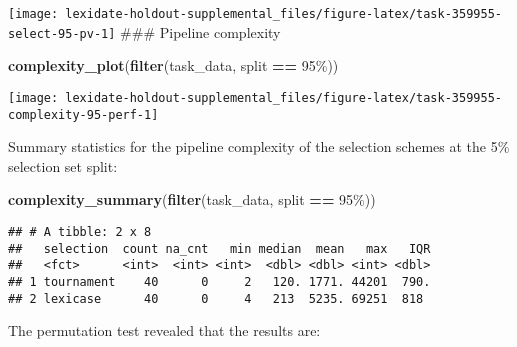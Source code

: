 \documentclass[
]{book}
\newenvironment{Shaded}{\begin{snugshade}}{\end{snugshade}}
\newcommand{\AttributeTok}[1]{\textcolor[rgb]{0.13,0.29,0.53}{#1}}
\newcommand{\DecValTok}[1]{\textcolor[rgb]{0.00,0.00,0.81}{#1}}
\newcommand{\FunctionTok}[1]{\textcolor[rgb]{0.13,0.29,0.53}{\textbf{#1}}}
\newcommand{\NormalTok}[1]{#1}
\newcommand{\OtherTok}[1]{\textcolor[rgb]{0.56,0.35,0.01}{#1}}
\newcommand{\SpecialCharTok}[1]{\textcolor[rgb]{0.81,0.36,0.00}{\textbf{#1}}}
\newcommand{\StringTok}[1]{\textcolor[rgb]{0.31,0.60,0.02}{#1}}
\begin{document}
\texttt{[image: lexidate-holdout-supplemental\_files/figure-latex/task-359955-select-95-pv-1]}
\#\#\# Pipeline complexity

\begin{Shaded}
\begin{Highlighting}[]
\FunctionTok{complexity\_plot}\NormalTok{(}\FunctionTok{filter}\NormalTok{(task\_data, split }\SpecialCharTok{==} \StringTok{\textquotesingle{}95\%\textquotesingle{}}\NormalTok{))}
\end{Highlighting}
\end{Shaded}

\texttt{[image: lexidate-holdout-supplemental\_files/figure-latex/task-359955-complexity-95-perf-1]}

Summary statistics for the pipeline complexity of the selection schemes at the 5\% selection set split:

\begin{Shaded}
\begin{Highlighting}[]
\FunctionTok{complexity\_summary}\NormalTok{(}\FunctionTok{filter}\NormalTok{(task\_data, split }\SpecialCharTok{==} \StringTok{\textquotesingle{}95\%\textquotesingle{}}\NormalTok{))}
\end{Highlighting}
\end{Shaded}

\begin{verbatim}
## # A tibble: 2 x 8
##   selection  count na_cnt   min median  mean   max   IQR
##   <fct>      <int>  <int> <int>  <dbl> <dbl> <int> <dbl>
## 1 tournament    40      0     2   120. 1771. 44201  790.
## 2 lexicase      40      0     4   213  5235. 69251  818
\end{verbatim}

The permutation test revealed that the results are:

\begin{Shaded}
\end{Shaded}
\end{document}
